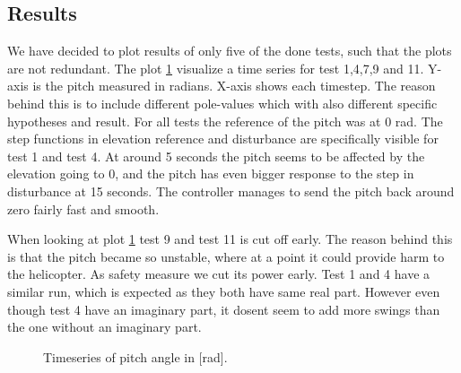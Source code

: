 \subsection{Results}
We have decided to plot results of only five of the done tests, such that the plots are not redundant.
The plot \ref{fig:pitch_plot} visualize a time series for test 1,4,7,9 and 11. Y-axis is the pitch measured in radians. X-axis shows each timestep. The reason behind this is to include different pole-values which
with also different specific hypotheses and result. For all tests the reference of the pitch was at 0 rad. The step functions in elevation reference and disturbance are specifically visible for test 1 and test 4. 
At around 5 seconds the pitch seems to be affected by the elevation going to 0, and the pitch has even bigger response to the step in disturbance at 15 seconds. The controller manages to send the pitch back around zero 
fairly fast and smooth. 

When looking at plot \ref{fig:pitch_plot} test 9 and test 11 is cut off early. The reason behind this is that 
the pitch became so unstable, where at a point it could provide harm to the helicopter. As safety measure we cut its power early. 
Test 1 and 4 have a similar run, which is expected as they both have same real part. However even though test 4 have an imaginary part, 
it dosent seem to add more swings than the one without an imaginary part.

\begin{figure}[h!]
    \centering
    \hfill
    \caption{Timeseries of pitch angle in [rad].}
    \label{fig:pitch_plot}
\end{figure}     

